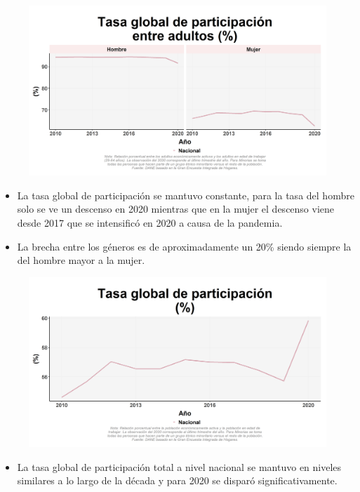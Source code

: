     \begin{figure}[H]
        \caption[Tasa global de participación de los adultos por género ]{\label{particadu_gen_trend} }
        \begin{center}
        \includegraphics[width=\textwidth,keepaspectratio]{img/var_82_trend.png}
        \end{center}
    \end{figure}
            \begin{itemize}
                \item La tasa global de participación se mantuvo constante, para la tasa del hombre solo se ve un descenso en 2020 mientras que en la mujer el descenso viene desde 2017 que se intensificó en 2020 a causa de la pandemia.
                \item La brecha entre los géneros es de aproximadamente un 20\% siendo siempre la del hombre mayor a la mujer.
                \end{itemize}

    \begin{figure}[H]
        \caption[Tasa global de participación a nivel nacional ]{\label{partic_nal_trend} }
        \begin{center}
        \includegraphics[width=\textwidth,keepaspectratio]{img/var_80_trend.png}
        \end{center}
    \end{figure}
            \begin{itemize}
                \item La tasa global de participación total a nivel nacional se mantuvo en niveles similares a lo largo de la década y para 2020 se disparó significativamente.
                \end{itemize}

